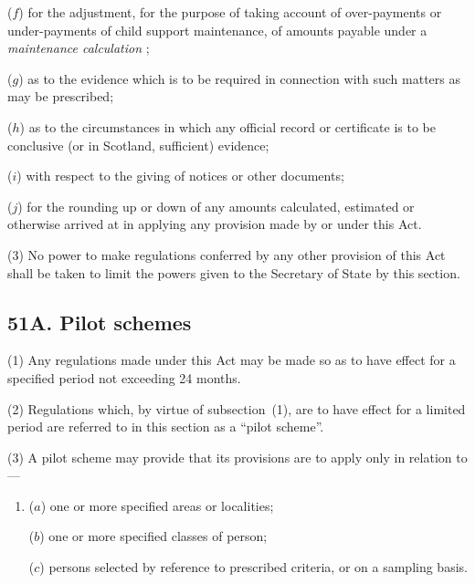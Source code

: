 \documentclass[12pt,a4paper]{article}
\begin{document}
\begin{enumerate}
\begin{sloppypar}
($f$) for the adjustment, for the purpose of taking account of over-payments or under-payments of child support maintenance, of amounts payable under a 
\emph{maintenance calculation}%
;
\end{sloppypar}

($g$) as to the evidence which is to be required in connection with such matters as may be prescribed;

($h$) as to the circumstances in which any official record or certificate is to be conclusive (or in Scotland, sufficient) evidence;

($i$) with respect to the giving of notices or other documents;

($j$) for the rounding up or down of any amounts calculated, estimated or otherwise arrived at in applying any provision made by or under this Act.
\end{enumerate}

(3) No power to make regulations conferred by any other provision of this Act shall be taken to limit the powers given to the Secretary of State by this section.


\subsection{51A. Pilot schemes}

(1) Any regulations made under this Act may be made so as to have effect for a specified period not exceeding 24 months.

(2)
Regulations which, by virtue of subsection~(1), are to have effect for a limited period are referred to in this section as a “pilot scheme”.

(3) A pilot scheme may provide that its provisions are to apply only in relation to---
\begin{enumerate}\item[]
($a$) one or more specified areas or localities;

($b$) one or more specified classes of person;

($c$) persons selected by reference to prescribed criteria, or on a sampling basis.
\end{enumerate}
\end{document}
